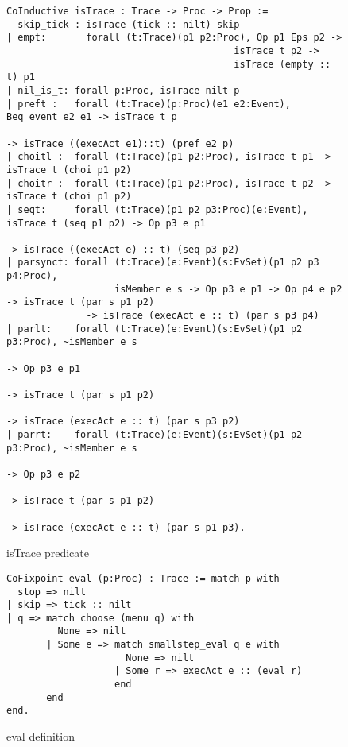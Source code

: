 \documentclass{comjnl}
\begin{document}
\begin{figure*}
\caption{\label{fig:my-label} isTrace predicate}
\begin{verbatim}
CoInductive isTrace : Trace -> Proc -> Prop :=
  skip_tick : isTrace (tick :: nilt) skip
| empt:       forall (t:Trace)(p1 p2:Proc), Op p1 Eps p2 -> 
                                        isTrace t p2 -> 
                                        isTrace (empty :: t) p1
| nil_is_t: forall p:Proc, isTrace nilt p
| preft :   forall (t:Trace)(p:Proc)(e1 e2:Event), Beq_event e2 e1 -> isTrace t p 
                                                                     -> isTrace ((execAct e1)::t) (pref e2 p)
| choitl :  forall (t:Trace)(p1 p2:Proc), isTrace t p1 -> isTrace t (choi p1 p2)
| choitr :  forall (t:Trace)(p1 p2:Proc), isTrace t p2 -> isTrace t (choi p1 p2)
| seqt:     forall (t:Trace)(p1 p2 p3:Proc)(e:Event), isTrace t (seq p1 p2) -> Op p3 e p1 
                                                                           -> isTrace ((execAct e) :: t) (seq p3 p2)
| parsynct: forall (t:Trace)(e:Event)(s:EvSet)(p1 p2 p3 p4:Proc),
                   isMember e s -> Op p3 e p1 -> Op p4 e p2 -> isTrace t (par s p1 p2) 
              -> isTrace (execAct e :: t) (par s p3 p4)
| parlt:    forall (t:Trace)(e:Event)(s:EvSet)(p1 p2 p3:Proc), ~isMember e s 
                                                                                           -> Op p3 e p1 
                                                                                           -> isTrace t (par s p1 p2) 
                                                                                           -> isTrace (execAct e :: t) (par s p3 p2)
| parrt:    forall (t:Trace)(e:Event)(s:EvSet)(p1 p2 p3:Proc), ~isMember e s 
                                                                                           -> Op p3 e p2 
                                                                                           -> isTrace t (par s p1 p2) 
                                                                                           -> isTrace (execAct e :: t) (par s p1 p3).
\end{verbatim} 
\end{figure*}

\begin{figure*}
\caption{\label{fig:my-label} eval definition}
\begin{verbatim}
CoFixpoint eval (p:Proc) : Trace := match p with
  stop => nilt
| skip => tick :: nilt
| q => match choose (menu q) with
         None => nilt
       | Some e => match smallstep_eval q e with
                     None => nilt
                   | Some r => execAct e :: (eval r)
                   end
       end
end.
\end{verbatim}
\end{figure*}



\end{document}
